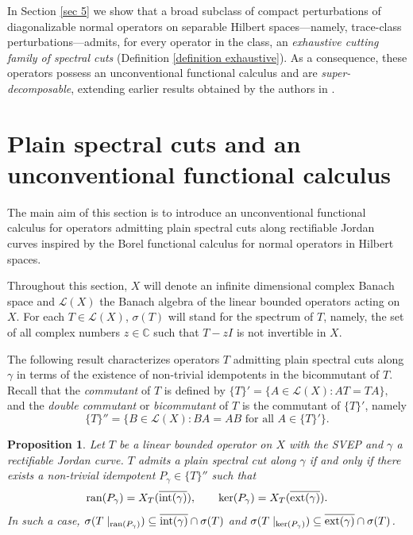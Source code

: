 \documentclass[11pt]{amsart}
\newtheorem{proposition}[theorem]{Proposition}
\theoremstyle{definition}
\theoremstyle{remark}
\numberwithin{equation}{section}
\newcommand{\ran}{\textnormal{ran}}
\newcommand{\biconm}[1]{{\{#1\}''}}
\newcommand{\inte}{\textnormal{int}}
\newcommand{\exte}{\textnormal{ext}}
\begin{document}
\smallskip

In Section \ref{sec 5} we show that a broad subclass of compact perturbations of diagonalizable normal operators on separable Hilbert spaces—namely, trace-class perturbations—admits, for every operator in the class, an \emph{exhaustive cutting family of spectral cuts} (Definition \ref{definition exhaustive}). As a consequence, these operators possess an unconventional functional calculus and are \emph{super-decomposable}, extending earlier results obtained by the authors in \cite{GG3}.

\section{Plain spectral cuts and an unconventional functional calculus} \label{sec 2}

The main aim of this section is to introduce an unconventional functional calculus for operators admitting  plain spectral cuts along rectifiable Jordan curves inspired by the Borel functional calculus for normal operators in Hilbert spaces.

\smallskip

Throughout this section, $X$ will denote an infinite dimensional complex Banach space and $\mathcal{L}(X)$ the Banach algebra of the linear bounded operators acting on $X$. For each $T\in \mathcal{L}(X)$, $\sigma(T)$ will stand for the spectrum of $T$, namely, the set of all complex numbers $ z \in \mathbb{C} $ such that $ T -z I $ is not invertible in $X$.


\smallskip

The following  result characterizes operators $T$ admitting plain spectral cuts along $\gamma$ in terms of the existence of non-trivial idempotents in the bicommutant of $T$. Recall that the \emph{commutant} of $T$ is defined by
$\{T\}'= \{ A \in \mathcal{L}(X) : AT = TA \},$ and the \emph{double commutant} or \emph{bicommutant} of $T$ is the commutant of $\{T\}'$, namely
$$
\{T\}'' = \{ B \in \mathcal{L}(X) : BA = AB \text{ for all } A \in \{T\}' \}.
$$

\begin{proposition}\label{proposicion spectral idempotent}
		Let $T$ be a linear bounded operator on $X$ with the SVEP and  $\gamma$ a rectifiable Jordan curve. $T$ admits a plain spectral cut along $\gamma$ if and only if there exists a non-trivial idempotent $P_\gamma \in \biconm{T}$ such that
        $$\ran(P_\gamma) = X_T(\overline{\inte(\gamma)}), \qquad \ker(P_\gamma) =  X_T(\overline{\exte(\gamma)}).$$
In such a case, $\sigma(T\mid_{\ran(P_\gamma)})\subseteq   \overline{\inte(\gamma)}\cap\sigma(T)$ and $\sigma(T\mid_{\ker(P_\gamma)})\subseteq   \overline{\exte(\gamma)}\cap\sigma(T)$.
\end{proposition}
\end{document}
